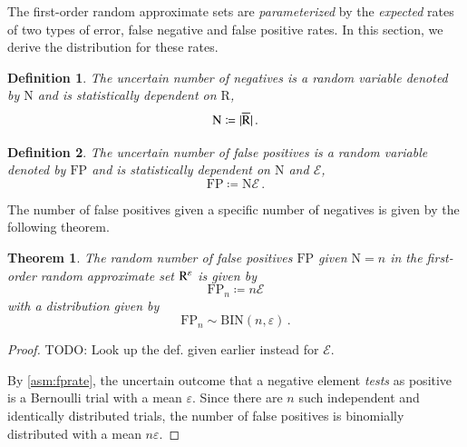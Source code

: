 \documentclass[10pt,final,hidelinks]{article}
\numberwithin{equation}{section}
\DeclarePairedDelimiter\Card{\lvert}{\rvert}
\newcommand{\FPR}{\mathcal{E}}
\newcommand{\FP}{\RV{FP}}
\newcommand{\fprate}{\varepsilon}
\newcommand{\RV}[1]{\mathrm{#1}}
\newcommand{\bindist}{\mathrm{BIN}}
\newcommand{\envnumstyle}{chapter}
\renewcommand{\envnumstyle}{chapter}
\renewcommand{\envnumstyle}{section}
\theoremstyle{plain}
\newtheorem{theorem}{Theorem}[\envnumstyle]
\newtheorem{definition}{Definition}[\envnumstyle]
\begin{document}
The first-order random approximate sets are \emph{parameterized} by the \emph{expected} rates of two types of error, false negative and false positive rates.
In this section, we derive the distribution for these rates.

\begin{definition}
The uncertain number of \emph{negatives} is a random variable denoted by $\RV{N}$ and is statistically dependent on $\RV{R}$,
\begin{equation}
\RV{N} \coloneqq \Card{\SetComplement[\RV{R}]}\,.
\end{equation}
\end{definition}

\begin{definition}
The uncertain number of false positives is a random variable denoted by $\FP$ and is statistically dependent on $\RV{N}$ and $\FPR$,
\begin{equation}
	\FP \coloneqq \RV{N} \FPR\,.
\end{equation}
\end{definition}

The number of false positives given a specific number of negatives is given by the following theorem.
\begin{theorem}
\label{thm:fpbinom}
The random number of false positives $\FP$ given $\RV{N} = n$ in the first-order random approximate set $\AT{\RV{R}}[\fprate]$ is given by
\begin{equation}
	\FP_n \coloneqq n \FPR
\end{equation}
with a distribution given by
\begin{equation}
    \FP_n \sim \bindist(n, \fprate)\,.
\end{equation}
\end{theorem}
\begin{proof}
TODO: Look up the def. given earlier instead for $\FPR$.

By \cref{asm:fprate}, the uncertain outcome that a negative element \emph{tests} as positive is a Bernoulli trial with a mean $\fprate$.
Since there are $n$ such independent and identically distributed trials, the number of false positives is binomially distributed with a mean $n \fprate$.
\end{proof}
\end{document}
